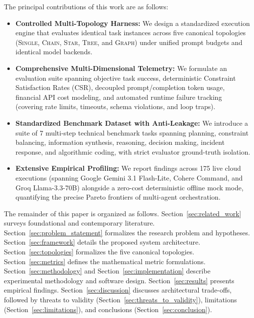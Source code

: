 The principal contributions of this work are as follows:
\begin{itemize}
    \item \textbf{Controlled Multi-Topology Harness:} We design a standardized execution engine that evaluates identical task instances across five canonical topologies (\textsc{Single}, \textsc{Chain}, \textsc{Star}, \textsc{Tree}, and \textsc{Graph}) under unified prompt budgets and identical model backends.
    \item \textbf{Comprehensive Multi-Dimensional Telemetry:} We formulate an evaluation suite spanning objective task success, deterministic Constraint Satisfaction Rates (CSR), decoupled prompt/completion token usage, financial API cost modeling, and automated runtime failure tracking (covering rate limits, timeouts, schema violations, and loop traps).
    \item \textbf{Standardized Benchmark Dataset with Anti-Leakage:} We introduce a suite of 7 multi-step technical benchmark tasks spanning planning, constraint balancing, information synthesis, reasoning, decision making, incident response, and algorithmic coding, with strict evaluator ground-truth isolation.
    \item \textbf{Extensive Empirical Profiling:} We report findings across 175 live cloud executions (spanning Google Gemini 3.1 Flash-Lite, Cohere Command, and Groq Llama-3.3-70B) alongside a zero-cost deterministic offline mock mode, quantifying the precise Pareto frontiers of multi-agent orchestration.
\end{itemize}

The remainder of this paper is organized as follows. Section~\ref{sec:related_work} surveys foundational and contemporary literature. Section~\ref{sec:problem_statement} formalizes the research problem and hypotheses. Section~\ref{sec:framework} details the proposed system architecture. Section~\ref{sec:topologies} formalizes the five canonical topologies. Section~\ref{sec:metrics} defines the mathematical metric formulations. Section~\ref{sec:methodology} and Section~\ref{sec:implementation} describe experimental methodology and software design. Section~\ref{sec:results} presents empirical findings. Section~\ref{sec:discussion} discusses architectural trade-offs, followed by threats to validity (Section~\ref{sec:threats_to_validity}), limitations (Section~\ref{sec:limitations}), and conclusions (Section~\ref{sec:conclusion}).

